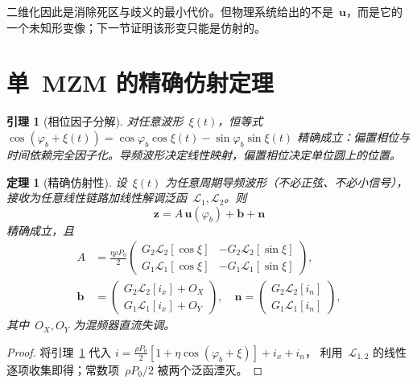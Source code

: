 \documentclass[11pt,journal,onecolumn]{IEEEtran}
\theoremstyle{plain}
\newtheorem{theorem}{定理}
\newtheorem{lemma}{引理}
\theoremstyle{remark}
\newcommand{\zv}{\mathbf{z}}
\newcommand{\uv}{\mathbf{u}}
\newcommand{\bv}{\mathbf{b}}
\newcommand{\nv}{\mathbf{n}}
\newcommand{\Lc}{\mathcal{L}}
\begin{document}
二维化因此是消除死区与歧义的最小代价。但物理系统给出的不是~$\uv$，而是它的一个未知形变像；下一节证明该形变只能是仿射的。

\section{单~MZM 的精确仿射定理}
\label{sec:affine}

\begin{lemma}[相位因子分解]
\label{lem:fact}
对任意波形~$\xi(t)$，恒等式
$\cos(\varphi_b+\xi(t))=\cos\varphi_b\cos\xi(t)-\sin\varphi_b\sin\xi(t)$
精确成立：偏置相位与时间依赖完全因子化。导频波形决定线性映射，偏置相位决定单位圆上的位置。
\end{lemma}

\begin{theorem}[精确仿射性]
\label{th:affine}
设~$\xi(t)$ 为任意周期导频波形（不必正弦、不必小信号），接收为任意线性链路加线性解调泛函~$\Lc_1,\Lc_2$。则
\begin{equation}
\boxed{\;\zv=A\,\uv(\varphi_b)+\bv+\nv\;}
\label{eq:affine}
\end{equation}
精确成立，且
\begin{align}
A&=\frac{\eta\rho P_0}{2}
\begin{pmatrix}
G_2\Lc_2[\cos\xi] & -G_2\Lc_2[\sin\xi]\\
G_1\Lc_1[\cos\xi] & -G_1\Lc_1[\sin\xi]
\end{pmatrix},\nonumber\\
\bv&=\begin{pmatrix}G_2\Lc_2[i_x]+O_X\\ G_1\Lc_1[i_x]+O_Y\end{pmatrix},\quad
\nv=\begin{pmatrix}G_2\Lc_2[i_n]\\ G_1\Lc_1[i_n]\end{pmatrix},
\label{eq:entries}
\end{align}
其中~$O_X,O_Y$ 为混频器直流失调。
\end{theorem}
\begin{proof}
将引理~\ref{lem:fact} 代入
$i=\tfrac{\rho P_0}{2}[1+\eta\cos(\varphi_b+\xi)]+i_x+i_n$，
利用~$\Lc_{1,2}$ 的线性逐项收集即得；常数项~$\rho P_0/2$ 被两个泛函湮灭。
\end{proof}
\end{document}
